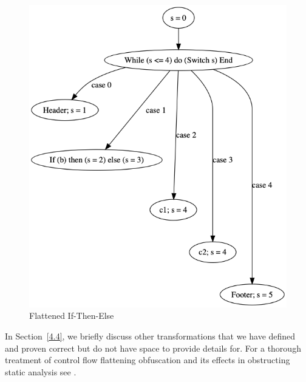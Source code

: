 \documentclass[compsoc,conference,a4paper,10pt,times]{IEEEtran}
\begin{document}
\begin{figure}[hbt]
\centering
\includegraphics[scale=0.27]{ifElseFlat}
\caption{Flattened If-Then-Else}
 \label{fig:flatIfElse}
\end{figure}
%

In Section~\ref{4.4}, we briefly discuss other transformations that we have defined and proven correct but do not have space to provide details for.
For a thorough treatment of control flow flattening obfuscation and its effects in obstructing static analysis see \cite{Wang}. 


\end{document}
